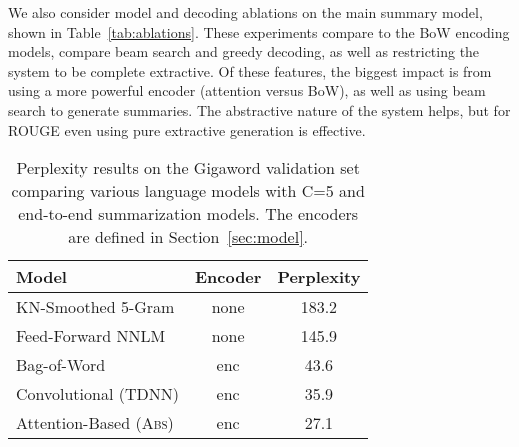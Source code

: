 \documentclass[11pt,a4paper]{article}
\begin{document}
We also consider model and decoding ablations on the main summary
model, shown in Table~\ref{tab:ablations}. These experiments
compare to the BoW encoding models, compare beam search and greedy
decoding, as well as restricting the system to be complete
extractive. Of these features, the biggest impact is from using a more
powerful encoder (attention versus BoW), as well as using beam search
to generate summaries. The abstractive nature of the system helps, but
for ROUGE even using pure extractive generation is effective.




\begin{table}
  \centering
  \small
  \begin{tabular}{lcc}
    \toprule
    Model & Encoder & Perplexity  \\
    \midrule
    KN-Smoothed 5-Gram  & none   & 183.2  \\
    Feed-Forward NNLM & none    & 145.9  \\
    Bag-of-Word   & enc  & 43.6   \\
    Convolutional (TDNN)  & enc  & 35.9  \\
    Attention-Based (\textsc{Abs})  & enc  & 27.1 \\
    \bottomrule
  \end{tabular}
  \caption{\small \label{tab:perp} Perplexity results on the Gigaword validation set comparing various language models with C=5 and end-to-end summarization models. The encoders are defined in Section~\ref{sec:model}.
  }
\end{table}
\end{document}
